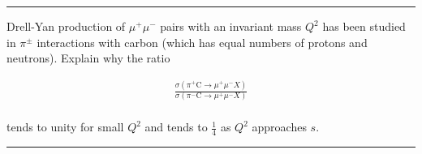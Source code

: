 \noindent\rule{7in}{1.5pt}


\begin{problem}{10.9}
Drell-Yan production of $\mu^+\mu^-$ pairs with an invariant mass $Q^2$ has been studied in $\pi^\pm$ interactions with carbon (which has equal numbers of protons and neutrons). Explain why the ratio

\begin{align*}
    \frac{\sigma\left( \pi^+ \text{C} \to \mu^+\mu^-X \right)}{\sigma\left( \pi^- \text{C} \to \mu^+\mu^-X \right)}
\end{align*}\\
tends to unity for small $Q^2$ and tends to $\frac{1}{4}$ as $Q^2$ approaches $s$.
\end{problem}
\begin{solution}

\end{solution}

\noindent\rule{7in}{1.5pt}

